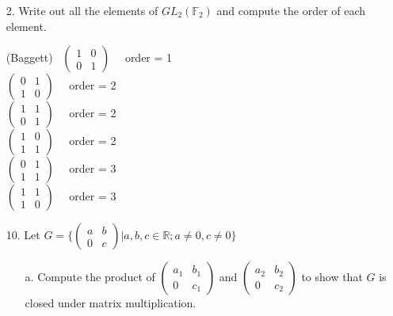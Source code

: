 \documentclass[10pt]{article}
\begin{document}
\begin{itemize}

\item[2.] Write out all the elements of $GL_{2}(\mathbb{F}_{2})$ and compute
the order of each element.

(Baggett) \ $\begin{pmatrix}1 & 0 \\ 0 & 1\end{pmatrix}$ \ \ order = 1
\\ $\begin{pmatrix}0 & 1 \\ 1 & 0\end{pmatrix}$ \ \ order = 2
\\ $\begin{pmatrix}1 & 1 \\ 0 & 1\end{pmatrix}$ \ \ order = 2
\\ $\begin{pmatrix}1 & 0 \\ 1 & 1\end{pmatrix}$ \ \ order = 2
\\ $\begin{pmatrix}0 & 1 \\ 1 & 1\end{pmatrix}$ \ \ order = 3
\\ $\begin{pmatrix}1 & 1 \\ 1 & 0\end{pmatrix}$ \ \ order = 3

\item[10.] Let $G = \{
\begin{pmatrix}a & b \\ 0 & c\end{pmatrix}
 | a,b,c\in \mathbb{R}; a \neq 0, c \neq 0\}$
	\begin{itemize}
	
	\item[a.] Compute the product of $\begin{pmatrix}a_1 & b_1 \\ 0 & c_1\end{pmatrix}$
	and $\begin{pmatrix}a_2 & b_2 \\ 0 & c_2\end{pmatrix}$ to show that $G$ is closed
	under matrix multiplication.


\end{itemize}
\end{itemize}
\end{document}
